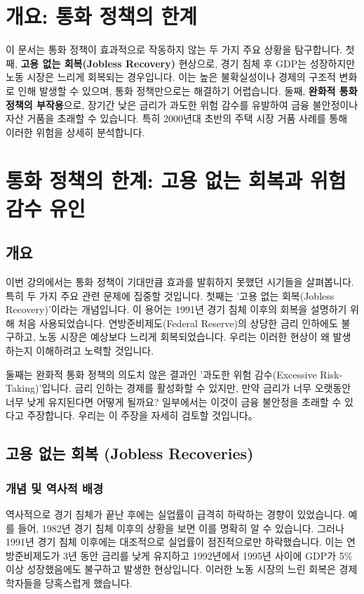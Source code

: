\documentclass[11pt,a4paper]{book}
\theoremstyle{definition}
\begin{document}
\section{개요: 통화 정책의 한계}

\begin{summarybox}[title={문서 전체 핵심 요약}]
이 문서는 통화 정책이 효과적으로 작동하지 않는 두 가지 주요 상황을 탐구합니다.
첫째, \textbf{고용 없는 회복(Jobless Recovery)} 현상으로, 경기 침체 후 GDP는 성장하지만 노동 시장은 느리게 회복되는 경우입니다.
이는 높은 불확실성이나 경제의 구조적 변화로 인해 발생할 수 있으며, 통화 정책만으로는 해결하기 어렵습니다.
둘째, \textbf{완화적 통화 정책의 부작용}으로, 장기간 낮은 금리가 과도한 위험 감수를 유발하여 금융 불안정이나 자산 거품을 초래할 수 있습니다.
특히 2000년대 초반의 주택 시장 거품 사례를 통해 이러한 위험을 상세히 분석합니다.
\end{summarybox}


\section{통화 정책의 한계: 고용 없는 회복과 위험 감수 유인}

\subsection{개요}
이번 강의에서는 통화 정책이 기대만큼 효과를 발휘하지 못했던 시기들을 살펴봅니다. 특히 두 가지 주요 관련 문제에 집중할 것입니다. 첫째는 '고용 없는 회복(Jobless Recovery)'이라는 개념입니다. 이 용어는 1991년 경기 침체 이후의 회복을 설명하기 위해 처음 사용되었습니다. 연방준비제도(Federal Reserve)의 상당한 금리 인하에도 불구하고, 노동 시장은 예상보다 느리게 회복되었습니다. 우리는 이러한 현상이 왜 발생하는지 이해하려고 노력할 것입니다.

둘째는 완화적 통화 정책의 의도치 않은 결과인 '과도한 위험 감수(Excessive Risk-Taking)'입니다. 금리 인하는 경제를 활성화할 수 있지만, 만약 금리가 너무 오랫동안 너무 낮게 유지된다면 어떻게 될까요? 일부에서는 이것이 금융 불안정을 초래할 수 있다고 주장합니다. 우리는 이 주장을 자세히 검토할 것입니다。

\subsection{고용 없는 회복 (Jobless Recoveries)}

\subsubsection{개념 및 역사적 배경}
역사적으로 경기 침체가 끝난 후에는 실업률이 급격히 하락하는 경향이 있었습니다. 예를 들어, 1982년 경기 침체 이후의 상황을 보면 이를 명확히 알 수 있습니다. 그러나 1991년 경기 침체 이후에는 대조적으로 실업률이 점진적으로만 하락했습니다. 이는 연방준비제도가 3년 동안 금리를 낮게 유지하고 1992년에서 1995년 사이에 GDP가 5\% 이상 성장했음에도 불구하고 발생한 현상입니다. 이러한 노동 시장의 느린 회복은 경제학자들을 당혹스럽게 했습니다.
\end{document}
